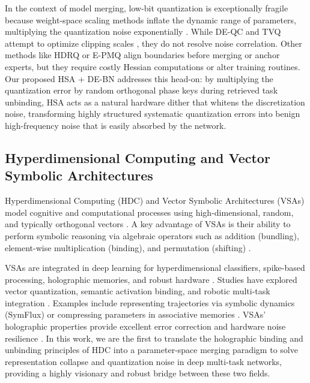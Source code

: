 \documentclass{article}
\theoremstyle{plain}
\theoremstyle{definition}
\theoremstyle{remark}
\begin{document}
In the context of model merging, low-bit quantization is exceptionally fragile because weight-space scaling methods inflate the dynamic range of parameters, multiplying the quantization noise exponentially \cite{anonymous2026b}. While DE-QC and TVQ attempt to optimize clipping scales \cite{anonymous2026b, Lavagna2025NovelQA}, they do not resolve noise correlation. Other methods like HDRQ \cite{hdrq2025} or E-PMQ \cite{epmq2026} align boundaries before merging or anchor experts, but they require costly Hessian computations or alter training routines. Our proposed HSA + DE-BN addresses this head-on: by multiplying the quantization error by random orthogonal phase keys during retrieved task unbinding, HSA acts as a natural hardware dither that whitens the discretization noise, transforming highly structured systematic quantization errors into benign high-frequency noise that is easily absorbed by the network.

\subsection{Hyperdimensional Computing and Vector Symbolic Architectures}
Hyperdimensional Computing (HDC) and Vector Symbolic Architectures (VSAs) model cognitive and computational processes using high-dimensional, random, and typically orthogonal vectors \cite{Zhou2025SynapseHDAU, Genssler2024FrontiersIE, McDonald2023IntegratingCV}. A key advantage of VSAs is their ability to perform symbolic reasoning via algebraic operators such as addition (bundling), element-wise multiplication (binding), and permutation (shifting) \cite{Genssler2024FrontiersIE, Ma2022HyperdimensionalCV}. 

VSAs are integrated in deep learning for hyperdimensional classifiers, spike-based processing, holographic memories, and robust hardware \cite{Sutor2022GluingNN, Morris2022HyperSpikeHC, Zhang2023HyperSpikeASICAE, Snyder2024BrainIP}. Studies have explored vector quantization, semantic activation binding, and robotic multi-task integration \cite{Penzkofer2024VSA4VQASA, Silva2025RoboticMI, Cumbo2026DesigningVA, Dhrubo2025AVS}. Examples include representing trajectories via symbolic dynamics (SymFlux) \cite{EvangelistaAlvarado2025SymFluxDS} or compressing parameters in associative memories \cite{Alam2024AWH, Gao2025ANR, Zhu2024NeuralNW, Son2025NSNQuantAD}. VSAs' holographic properties provide excellent error correction and hardware noise resilience \cite{Zhang2025ExpertMM}. In this work, we are the first to translate the holographic binding and unbinding principles of HDC into a parameter-space merging paradigm to solve representation collapse and quantization noise in deep multi-task networks, providing a highly visionary and robust bridge between these two fields.
\end{document}
